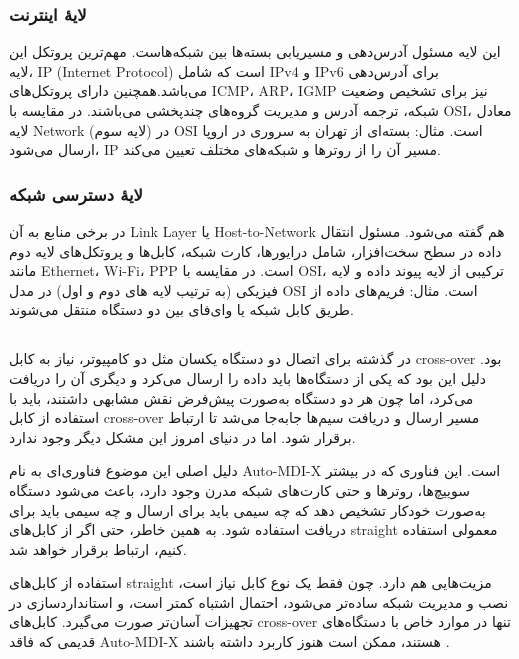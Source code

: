 \documentclass[12pt]{article}
\begin{document}
	\subsubsection*{لایهٔ اینترنت}
	این لایه مسئول آدرس‌دهی و مسیریابی بسته‌ها بین شبکه‌هاست. مهم‌ترین پروتکل این لایه، IP (Internet Protocol) است که شامل IPv4 و IPv6 برای آدرس‌دهی می‌باشد.همچنین دارای پروتکل‌های ICMP، ARP، IGMP نیز برای تشخیص وضعیت شبکه، ترجمه آدرس و مدیریت گروه‌های چندپخشی می‌باشند. در مقایسه با OSI، معادل لایه Network (لایه سوم) در OSI است. مثال: بسته‌ای از تهران به سروری در اروپا ارسال می‌شود، IP مسیر آن را از روترها و شبکه‌های مختلف تعیین می‌کند.
	\subsubsection*{لایهٔ دسترسی شبکه}
	در برخی منابع به آن Link Layer یا Host-to-Network هم گفته می‌شود. مسئول انتقال داده در سطح سخت‌افزار، شامل درایورها، کارت شبکه، کابل‌ها و پروتکل‌های لایه دوم مانند Ethernet، Wi-Fi، PPP است. در مقایسه با OSI، ترکیبی از لایه پیوند داده و لایه فیزیکی (به ترتیب لایه های دوم و اول) در مدل OSI است. مثال: فریم‌های داده از طریق کابل شبکه یا وای‌فای بین دو دستگاه منتقل می‌شوند.
	\subsection{}
	در گذشته برای اتصال دو دستگاه یکسان مثل دو کامپیوتر، نیاز به کابل cross-over بود. دلیل این بود که یکی از دستگاه‌ها باید داده را ارسال می‌کرد و دیگری آن را دریافت می‌کرد، اما چون هر دو دستگاه به‌صورت پیش‌فرض نقش مشابهی داشتند، باید با استفاده از کابل cross-over مسیر ارسال و دریافت سیم‌ها جابه‌جا می‌شد تا ارتباط برقرار شود. اما در دنیای امروز این مشکل دیگر وجود ندارد.
	
	دلیل اصلی این موضوع فناوری‌ای به نام Auto-MDI-X است. این فناوری که در بیشتر سوییچ‌ها، روترها و حتی کارت‌های شبکه مدرن وجود دارد، باعث می‌شود دستگاه به‌صورت خودکار تشخیص دهد که چه سیمی باید برای ارسال و چه سیمی باید برای دریافت استفاده شود. به همین خاطر، حتی اگر از کابل‌های straight معمولی استفاده کنیم، ارتباط برقرار خواهد شد.
	
	استفاده از کابل‌های straight مزیت‌هایی هم دارد. چون فقط یک نوع کابل نیاز است، نصب و مدیریت شبکه ساده‌تر می‌شود، احتمال اشتباه کمتر است، و استانداردسازی در تجهیزات آسان‌تر صورت می‌گیرد. کابل‌های cross-over تنها در موارد خاص با دستگاه‌های قدیمی که فاقد Auto-MDI-X هستند، ممکن است هنوز کاربرد داشته باشند 
	\cite{a11, a12, a13}.
	
	\newpage
	\begin{LTR}
		\printbibliography[title={مراجع}]
	\end{LTR}

	
\end{document}
